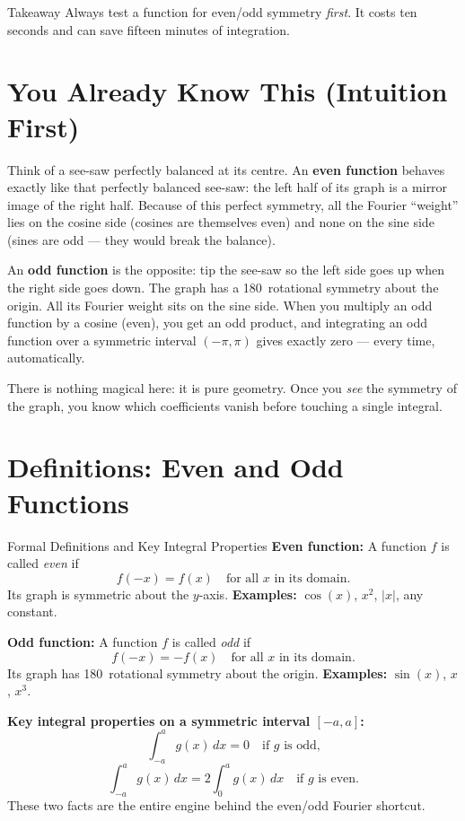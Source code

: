 \documentclass[12pt,a4paper]{article}
\begin{document}
\begin{learnbox}{Takeaway}
Always test a function for even/odd symmetry \emph{first}. It costs ten seconds and can save
fifteen minutes of integration.
\end{learnbox}

\section{You Already Know This (Intuition First)}

Think of a see-saw perfectly balanced at its centre. An \textbf{even function} behaves exactly
like that perfectly balanced see-saw: the left half of its graph is a mirror image of the right
half. Because of this perfect symmetry, all the Fourier ``weight'' lies on the cosine side
(cosines are themselves even) and none on the sine side (sines are odd --- they would break the
balance).

An \textbf{odd function} is the opposite: tip the see-saw so the left side goes up when the
right side goes down. The graph has a 180\textdegree\ rotational symmetry about the origin.
All its Fourier weight sits on the sine side. When you multiply an odd function by a cosine
(even), you get an odd product, and integrating an odd function over a symmetric interval
$(-\pi, \pi)$ gives exactly zero --- every time, automatically.

There is nothing magical here: it is pure geometry. Once you \emph{see} the symmetry of the
graph, you know which coefficients vanish before touching a single integral.

\section{Definitions: Even and Odd Functions}

\begin{infobox}{Formal Definitions and Key Integral Properties}
\textbf{Even function:} A function $f$ is called \emph{even} if
\[
  f(-x) = f(x) \quad \text{for all } x \text{ in its domain.}
\]
Its graph is symmetric about the $y$-axis.
\textbf{Examples:} $\cos(x)$, $x^2$, $|x|$, any constant.

\medskip

\textbf{Odd function:} A function $f$ is called \emph{odd} if
\[
  f(-x) = -f(x) \quad \text{for all } x \text{ in its domain.}
\]
Its graph has 180\textdegree\ rotational symmetry about the origin.
\textbf{Examples:} $\sin(x)$, $x$, $x^3$.

\medskip

\textbf{Key integral properties on a symmetric interval $[-a, a]$:}
\[
  \int_{-a}^{a} g(x)\,dx = 0 \quad \text{if } g \text{ is odd,}
\]
\[
  \int_{-a}^{a} g(x)\,dx = 2\int_{0}^{a} g(x)\,dx \quad \text{if } g \text{ is even.}
\]
These two facts are the entire engine behind the even/odd Fourier shortcut.
\end{infobox}
\end{document}
